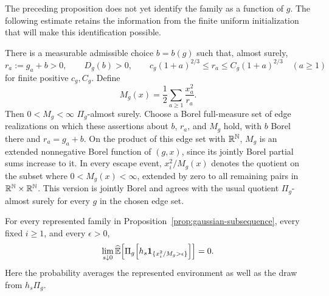 The preceding proposition does not yet identify the family as a
function of \(g\).  The following estimate retains the information
from the finite uniform initialization that will make this
identification possible.

\begin{proposition}
\label{prop:uniform-seed-escape}
There is a measurable admissible choice \(b=b(g)\) such that, almost
surely,
\begin{equation}
 r_a:=g_a+b>0,\qquad D_g(b)>0,\qquad
 c_g(1+a)^{2/3}\le r_a\le C_g(1+a)^{2/3}\quad(a\ge1)
 \label{glim:rates}
\end{equation}
for finite positive \(c_g,C_g\).  Define
\begin{equation}
 M_g(x)=\frac12\sum_{a\ge1}\frac{x_a^2}{r_a}.
 \label{glim:weighted-size}
\end{equation}
Then \(0<M_g<\infty\) \(\Pi_g\)-almost surely.  Choose a Borel
full-measure set of edge realizations on which these assertions about
\(b\), \(r_a\), and \(M_g\) hold, with \(b\) Borel there and
\(r_a=g_a+b\).  On the product of this edge set with \(\mathbb R^\mathbb N\),
\(M_g\) is an extended nonnegative Borel function of \((g,x)\), since
its jointly Borel partial sums increase to it.  In every escape event,
\(x_i^2/M_g(x)\) denotes the quotient on the subset where
\(0<M_g(x)<\infty\), extended by zero to all remaining pairs in
\(\mathbb R^\mathbb N\times\mathbb R^\mathbb N\).  This version is jointly Borel and agrees with
the usual quotient \(\Pi_g\)-almost surely for every \(g\) in the
chosen edge set.

For every represented family in
Proposition~\ref{prop:gaussian-subsequence}, every fixed
\(i\ge1\), and every \(\epsilon>0\),
\begin{equation}
 \lim_{s\downarrow0}
 \widehat{\mathbb E}\!\left[
    \Pi_g\!\left[h_s\mathbf 1_{\{x_i^2/M_g>\epsilon\}}\right]\right]=0.
 \label{glim:seed-escape}
\end{equation}
Here the probability averages the represented environment as well as
the draw from \(h_s\Pi_g\).
\end{proposition}

